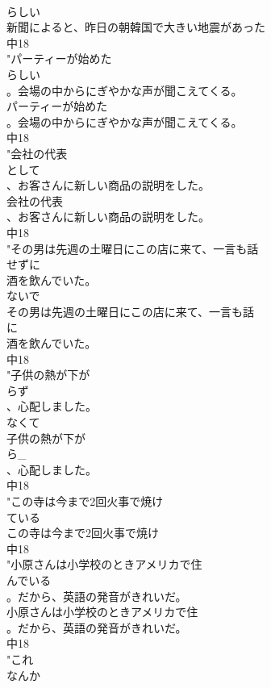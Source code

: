 \documentclass[8pt]{extreport}
\begin{document}
\begin{CJK}{UTF8}{min}
\\	らしい
\\	新聞によると、昨日の朝韓国で大きい地震があった
\\	中18
\\	"パーティーが始めた
\\	らしい
\\	。会場の中からにぎやかな声が聞こえてくる。
\\	パーティーが始めた
\\	。会場の中からにぎやかな声が聞こえてくる。
\\	中18
\\	"会社の代表
\\	として
\\	、お客さんに新しい商品の説明をした。
\\	会社の代表
\\	、お客さんに新しい商品の説明をした。
\\	中18
\\	"その男は先週の土曜日にこの店に来て、一言も話
\\	せずに
\\	酒を飲んでいた。
\\	ないで	
\\	その男は先週の土曜日にこの店に来て、一言も話
\\	に
\\	酒を飲んでいた。
\\	中18
\\	"子供の熱が下が
\\	らず
\\	、心配しました。
\\	なくて 
\\	子供の熱が下が
\\	ら_
\\	、心配しました。
\\	中18
\\	"この寺は今まで2回火事で焼け
\\	ている
\\	この寺は今まで2回火事で焼け
\\	中18
\\	"小原さんは小学校のときアメリカで住
\\	んでいる
\\	。だから、英語の発音がきれいだ。
\\	小原さんは小学校のときアメリカで住
\\	。だから、英語の発音がきれいだ。
\\	中18
\\	"これ
\\	なんか

\end{CJK}
\end{document}
